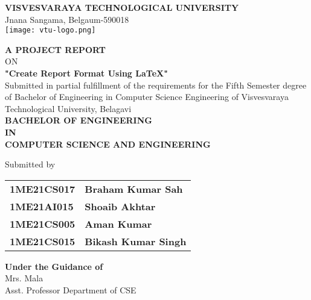 \documentclass[12pt, a4paper]{report} %
\begin{document}
	
	\begin{titlepage} %
		\begin{center} %
			
			\textbf{{\large VISVESVARAYA TECHNOLOGICAL UNIVERSITY}}\\
			{\normalsize Jnana Sangama, Belgaum-590018}\\
			\vspace{0.3in}
			\texttt{[image: vtu-logo.png]}\\
			\vspace{0.3in}
			
			\textbf{A PROJECT REPORT} \\
			ON \\
			\vspace{0.2in}
			\textbf{{\large "Create Report Format Using LaTeX"}}\\
			\vspace{0.1in}
			{\small Submitted in partial fulfillment of the requirements for the Fifth Semester degree of 
              Bachelor of Engineering in Computer Science Engineering of Visvesvaraya Technological 
              University, Belagavi}\\
			\vspace{0.1in}
			\textbf{BACHELOR OF ENGINEERING\\IN\\COMPUTER SCIENCE AND ENGINEERING}\\
			\vspace{0.2in}
			
			Submitted by\\
			\vspace{0.08in}
			\begin{tabular}{ll}
				\textbf{1ME21CS017} & \textbf{Braham Kumar Sah}\\
				\textbf{1ME21AI015} & \textbf{Shoaib Akhtar}\\
				\textbf{1ME21CS005} & \textbf{Aman Kumar}\\
				\textbf{1ME21CS015} & \textbf{Bikash Kumar Singh}\\
			\end{tabular}
			
			\vspace{0.2in}
			
			\textbf{Under the Guidance of}\\
			Mrs. Mala\\
			Asst. Professor Department of CSE\\
			

\end{center}
\end{titlepage}
\end{document}
